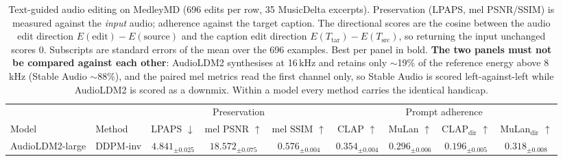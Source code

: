 %
%
%

\begin{table}[t]
  \centering
  \caption{Text-guided audio editing on MedleyMD (696 edits per row, 35 MusicDelta excerpts).
    Preservation (LPAPS, mel PSNR/SSIM) is measured against the \emph{input} audio; adherence
    against the target caption. The directional scores are the cosine between the audio edit
    direction $E(\text{edit}) - E(\text{source})$ and the caption edit direction
    $E(T_{\text{tar}}) - E(T_{\text{src}})$, so returning the input unchanged scores $0$.
    Subscripts are standard errors of the mean over the 696 examples. Best per panel in bold.
    \textbf{The two panels must not be compared against each other}: AudioLDM2 synthesises at
    16\,kHz and retains only $\sim$19\% of the reference energy above 8\,kHz (Stable Audio
    $\sim$88\%), and the paired mel metrics read the first channel only, so Stable Audio is
    scored left-against-left while AudioLDM2 is scored as a downmix. Within a model every method
    carries the identical handicap.}
  \label{tab:medleymd-baselines}
  \small
  \begin{tabular}{ll ccc cccc}
    \toprule
    & & \multicolumn{3}{c}{Preservation} & \multicolumn{4}{c}{Prompt adherence} \\
    \cmidrule(lr){3-5} \cmidrule(lr){6-9}
    Model & Method & LPAPS $\downarrow$ & mel PSNR $\uparrow$ & mel SSIM $\uparrow$
      & CLAP $\uparrow$ & MuLan $\uparrow$ & CLAP$_{\text{dir}}$ $\uparrow$ & MuLan$_{\text{dir}}$ $\uparrow$ \\
    \midrule
    \multirow{3}{*}{AudioLDM2-large}
      & DDPM-inv & $\mathbf{4.841}_{\pm 0.025}$ & $\mathbf{18.572}_{\pm 0.075}$ & $\mathbf{0.576}_{\pm 0.004}$ & $0.354_{\pm 0.004}$ & $0.296_{\pm 0.006}$ & $0.196_{\pm 0.005}$ & $0.318_{\pm 0.008}$ \\

\end{tabular}
\end{table}
